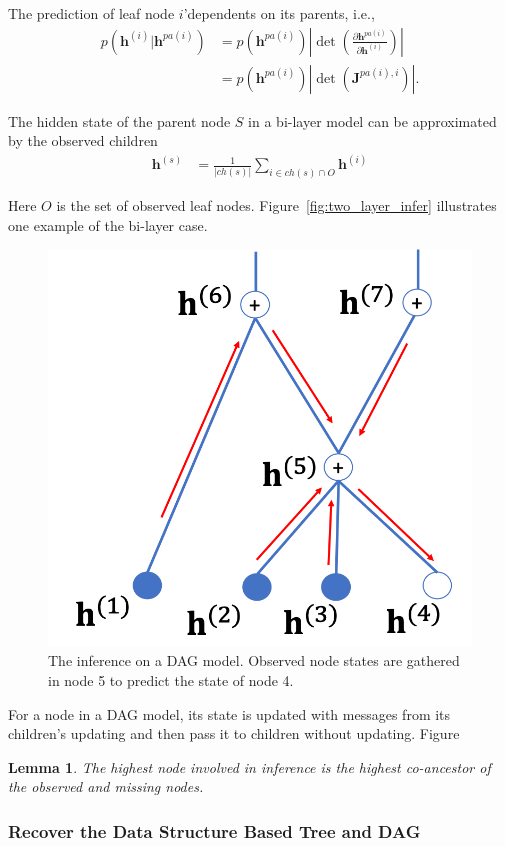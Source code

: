 \documentclass[conference]{IEEEtran}
\newtheorem{lemma}{Lemma}
\begin{document}
The prediction of leaf node $i$'dependents on its parents, i.e.,
\begin{align*}
p(\mathbf{h}^{(i)} | \mathbf{h}^{pa(i)}) & = p(\mathbf{h}^{pa(i)}) |\det(\frac{\partial \mathbf{h}^{pa(i)} }{\partial \mathbf{h}^{(i)}})| \\
& =
p(\mathbf{h}^{pa(i)}) |\det(\mathbf{J}^{pa(i),i})| .
\end{align*} 

The hidden state of the parent node $S$ in a bi-layer model can be approximated by the observed children
 \begin{align*}%
   \mathbf{h}^{(s)} & = \frac{1}{|ch(s)|}\sum_{i \in ch(s) \cap O} \mathbf{h}^{(i)} 
 \end{align*}
 
 Here $O$ is the set of observed leaf nodes. Figure~\ref{fig:two_layer_infer} illustrates one example of the bi-layer  case. 

\begin{figure}[!htbp] %
\begin{center}
 \includegraphics[width=0.43\linewidth]{fig/dag_infer.png}
\end{center}
   \caption{The inference on a DAG model. Observed node states are gathered in node 5 to predict the state of node 4. }
\label{fig:dag_infer}
\end{figure}

For a node in a DAG model, its state is updated with messages from its children's updating and then pass it to   children without updating. Figure~

\begin{lemma}
The highest node involved in  inference is the highest co-ancestor of the observed  and  missing nodes.
\end{lemma}





\subsubsection{Recover the Data Structure Based Tree and DAG}
\end{document}
